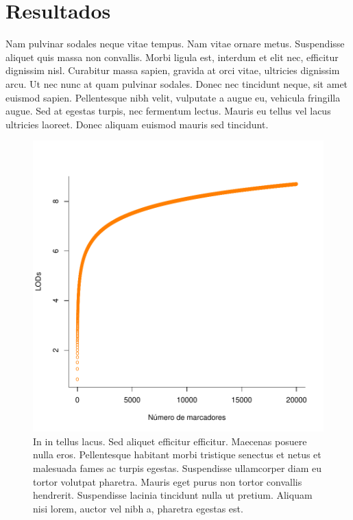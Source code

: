 \chapter{Resultados}

Nam pulvinar sodales neque vitae tempus. Nam vitae ornare metus.
Suspendisse aliquet quis massa non convallis. Morbi ligula est,
interdum et elit nec, efficitur dignissim nisl. Curabitur massa
sapien, gravida at orci vitae, ultricies dignissim arcu. Ut nec nunc
at quam pulvinar sodales. Donec nec tincidunt neque, sit amet euismod
sapien. Pellentesque nibh velit, vulputate a augue eu, vehicula
fringilla augue. Sed at egestas turpis, nec fermentum lectus. Mauris
eu tellus vel lacus ultricies laoreet. Donec aliquam euismod mauris
sed tincidunt. 

\begin{figure}[htb]
  \centering
  \includegraphics[scale=0.35]{figuras/graphical_model.pdf}
  \caption{In in tellus lacus. Sed aliquet efficitur efficitur.
    Maecenas posuere nulla eros. Pellentesque habitant morbi tristique
    senectus et netus et malesuada fames ac turpis egestas.
    Suspendisse ullamcorper diam eu tortor volutpat pharetra. Mauris
    eget purus non tortor convallis hendrerit. Suspendisse lacinia
    tincidunt nulla ut pretium. Aliquam nisi lorem, auctor vel nibh a,
    pharetra egestas est.}
  \label{fig:1}
\end{figure}

